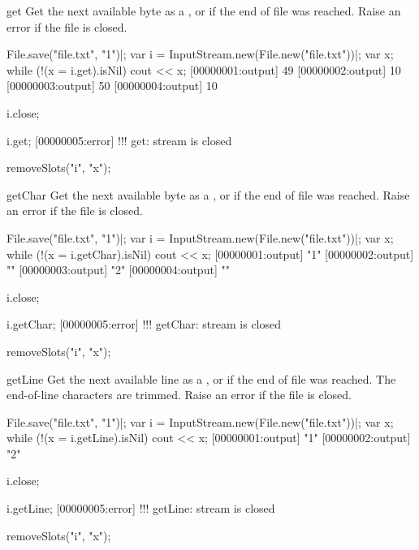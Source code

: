 \begin{urbiscriptapi}
\item[get]%
  Get the next available byte as a , or  if
  the end of file was reached.  Raise an error if the file is closed.
\begin{urbiscript}
File.save("file.txt", "1\n")|;
var i = InputStream.new(File.new("file.txt"))|;
var x;
while (!(x = i.get).isNil)
  cout << x;
[00000001:output] 49
[00000002:output] 10
[00000003:output] 50
[00000004:output] 10

i.close;

i.get;
[00000005:error] !!! get: stream is closed
\end{urbiscript}
\begin{urbicomment}
removeSlots("i", "x");
\end{urbicomment}


\item[getChar]%
  Get the next available byte as a , or 
  if the end of file was reached.  Raise an error if the file is closed.
\begin{urbiscript}
File.save("file.txt", "1\n")|;
var i = InputStream.new(File.new("file.txt"))|;
var x;
while (!(x = i.getChar).isNil)
  cout << x;
[00000001:output] "1"
[00000002:output] "\n"
[00000003:output] "2"
[00000004:output] "\n"

i.close;

i.getChar;
[00000005:error] !!! getChar: stream is closed
\end{urbiscript}
\begin{urbicomment}
removeSlots("i", "x");
\end{urbicomment}


\item[getLine]%
  Get the next available line as a , or  if
  the end of file was reached.  The end-of-line characters are trimmed.
  Raise an error if the file is closed.
\begin{urbiscript}
File.save("file.txt", "1\n")|;
var i = InputStream.new(File.new("file.txt"))|;
var x;
while (!(x = i.getLine).isNil)
  cout << x;
[00000001:output] "1"
[00000002:output] "2"

i.close;

i.getLine;
[00000005:error] !!! getLine: stream is closed
\end{urbiscript}
\begin{urbicomment}
removeSlots("i", "x");
\end{urbicomment}
\end{urbiscriptapi}


